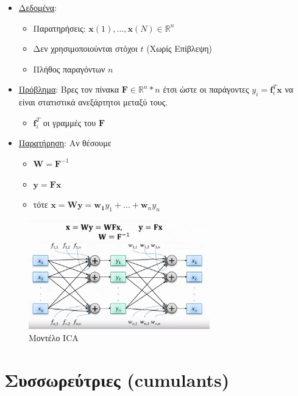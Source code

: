 \documentclass[22pt,a4paper]{article}
\theoremstyle{definition}
\begin{document}
\begin{itemize}
  \item \underline{Δεδομένα}:
        \begin{itemize}
          \item Παρατηρήσεις: $\pmb{x}(1),...,\pmb{x}(N) \in \mathbb{R}^n $
          \item Δεν χρησιμοποιούνται στόχοι $t$ (Χωρίς Επίβλεψη)
          \item Πλήθος παραγόντων $n$
        \end{itemize}
  \item \underline{Πρόβλημα}: Βρες τον πίνακα $\pmb{F} \in \mathbb{R}^n*n$ έτσι ώστε οι παράγοντες $y_i = \pmb{f}^T_i \pmb{x}$ να είναι στατιστικά ανεξάρτητοι μεταξύ τους.
        \begin{itemize}
          \item $\pmb{f}^T_i$ οι γραμμές του $\pmb{F}$
        \end{itemize}
  \item \underline{Παρατήρηση}: Αν θέσουμε
        \begin{itemize}
          \item $\pmb{W} = \pmb{F}^{-1}$
          \item $\pmb{y} = \pmb{Fx}$
          \item τότε $\pmb{x = Wy = w_1}y_1+...+\pmb{w}_n y_n$
        \end{itemize}
\end{itemize}

\begin{figure}[h]
  \caption{Μοντέλο ICA}
  \centering
  \includegraphics[width=0.70\textwidth]{./images/ica_model.jpg}
\end{figure}


\section*{Συσσωρεύτριες (cumulants)}
\end{document}
